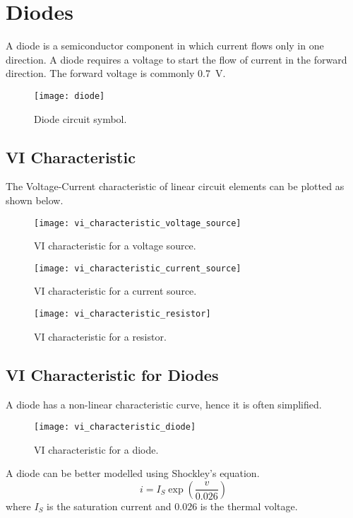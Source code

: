 \documentclass{article}
\begin{document}
\section{Diodes}
\begin{definition}[Diode]
    A diode is a semiconductor component in which current flows only in one direction. A diode requires a voltage to start the flow of current in the forward direction.
    The forward voltage is commonly \SI{0.7}{\volt}.
\end{definition}
\begin{figure}[H]
    \centering
    \texttt{[image: diode]}
    \caption{Diode circuit symbol.}
\end{figure}
\subsection{VI Characteristic}
The Voltage-Current characteristic of linear circuit elements can be plotted as shown below.
\begin{figure}[H]
    \centering
    \texttt{[image: vi\_characteristic\_voltage\_source]}
    \caption{VI characteristic for a voltage source.}
\end{figure}
\begin{figure}[H]
    \centering
    \texttt{[image: vi\_characteristic\_current\_source]}
    \caption{VI characteristic for a current source.}
\end{figure}
\begin{figure}[H]
    \centering
    \texttt{[image: vi\_characteristic\_resistor]}
    \caption{VI characteristic for a resistor.}
\end{figure}
\subsection{VI Characteristic for Diodes}
A diode has a non-linear characteristic curve, hence it is often simplified.
\begin{figure}[H]
    \centering
    \texttt{[image: vi\_characteristic\_diode]}
    \caption{VI characteristic for a diode.}
\end{figure}
\begin{theorem}
    A diode can be better modelled using Shockley's equation.
    \begin{equation*}
        i = I_S \exp{\left( \frac{v}{0.026} \right)}
    \end{equation*}
    where $I_S$ is the saturation current and $0.026$ is the thermal voltage.
\end{theorem}
\end{document}
